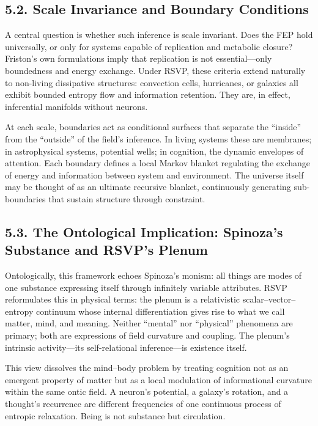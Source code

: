 \documentclass[12pt,a4paper]{article}
\begin{document}
\subsection{5.2. Scale Invariance and Boundary Conditions}

A central question is whether such inference is scale invariant.  
Does the FEP hold universally, or only for systems capable of replication and metabolic closure?  
Friston’s own formulations imply that replication is not essential—only boundedness and energy exchange.  
Under RSVP, these criteria extend naturally to non-living dissipative structures: convection cells, hurricanes, or galaxies all exhibit bounded entropy flow and information retention.  
They are, in effect, inferential manifolds without neurons.

At each scale, boundaries act as conditional surfaces that separate the “inside” from the “outside” of the field’s inference.  
In living systems these are membranes; in astrophysical systems, potential wells; in cognition, the dynamic envelopes of attention.  
Each boundary defines a local Markov blanket regulating the exchange of energy and information between system and environment.  
The universe itself may be thought of as an ultimate recursive blanket, continuously generating sub-boundaries that sustain structure through constraint.

\subsection{5.3. The Ontological Implication: Spinoza’s Substance and RSVP’s Plenum}

Ontologically, this framework echoes Spinoza’s monism: all things are modes of one substance expressing itself through infinitely variable attributes.  
RSVP reformulates this in physical terms: the plenum is a relativistic scalar–vector–entropy continuum whose internal differentiation gives rise to what we call matter, mind, and meaning.  
Neither “mental” nor “physical” phenomena are primary; both are expressions of field curvature and coupling.  
The plenum’s intrinsic activity—its self-relational inference—is existence itself.

This view dissolves the mind–body problem by treating cognition not as an emergent property of matter but as a local modulation of informational curvature within the same ontic field.  
A neuron’s potential, a galaxy’s rotation, and a thought’s recurrence are different frequencies of one continuous process of entropic relaxation.  
Being is not substance but circulation.
\end{document}
